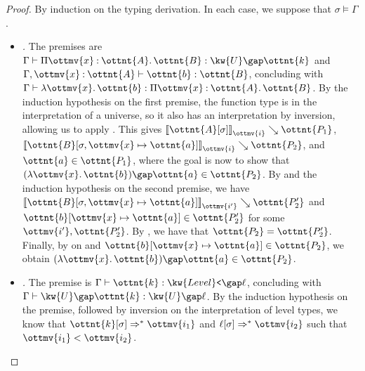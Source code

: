 \documentclass[a4paper,UKenglish,cleveref,autoref,thm-restate]{lipics-v2021}
\begin{document}
\begin{proof}
  By induction on the typing derivation.
  In each case, we suppose that $ \sigma  \vDash  \Gamma $.
  \begin{itemize}
    \item \textit{.}
      The premises are $ \Gamma  \vdash   \Pi  \ottmv{x}  \mathbin{:}  \ottnt{A}  \mathpunct{.}  \ottnt{B}   \mathrel{:}   \kw{U} \gap  \ottnt{k}  $ and $  \Gamma ,  \ottmv{x}  \mathbin{:}  \ottnt{A}   \vdash  \ottnt{b}  \mathrel{:}  \ottnt{B} $,
      concluding with $ \Gamma  \vdash   \lambda  \ottmv{x}  \mathpunct{.}  \ottnt{b}   \mathrel{:}   \Pi  \ottmv{x}  \mathbin{:}  \ottnt{A}  \mathpunct{.}  \ottnt{B}  $.
      By the induction hypothesis on the first premise,
      the function type is in the interpretation of a universe,
      so it also has an interpretation by inversion,
      allowing us to apply .
      This gives $ \mathopen{\llbracket}   \ottnt{A} [  \sigma  ]   \mathclose{\rrbracket}_{ \ottmv{i} } \searrow  \ottnt{P_{{\mathrm{1}}}} $, $ \mathopen{\llbracket}   \ottnt{B} [   \sigma ,  \ottmv{x}  \mapsto  \ottnt{a}   ]   \mathclose{\rrbracket}_{ \ottmv{i} } \searrow  \ottnt{P_{{\mathrm{2}}}} $, and $ \ottnt{a}  \in  \ottnt{P_{{\mathrm{1}}}} $,
      where the goal is now to show that $   (  \lambda  \ottmv{x}  \mathpunct{.}  \ottnt{b}  )   \gap  \ottnt{a}   \in  \ottnt{P_{{\mathrm{2}}}} $.
      By  and the induction hypothesis on the second premise,
      we have $ \mathopen{\llbracket}   \ottnt{B} [   \sigma ,  \ottmv{x}  \mapsto  \ottnt{a}   ]   \mathclose{\rrbracket}_{ \ottmv{i'} } \searrow  \ottnt{P'_{{\mathrm{2}}}} $ and $  \ottnt{b} [  \ottmv{x}  \mapsto  \ottnt{a}  ]   \in  \ottnt{P'_{{\mathrm{2}}}} $ for some $\ottmv{i'}, \ottnt{P'_{{\mathrm{2}}}}$.
      By , we have that $\ottnt{P_{{\mathrm{2}}}} = \ottnt{P'_{{\mathrm{2}}}}$.
      Finally, by  on  and $  \ottnt{b} [  \ottmv{x}  \mapsto  \ottnt{a}  ]   \in  \ottnt{P_{{\mathrm{2}}}} $,
      we obtain $   (  \lambda  \ottmv{x}  \mathpunct{.}  \ottnt{b}  )   \gap  \ottnt{a}   \in  \ottnt{P_{{\mathrm{2}}}} $.
    \item \textit{.}
      The premise is $ \Gamma  \vdash  \ottnt{k}  \mathrel{:}   \kw{Level}\texttt{<} \gap  \ell  $,
      concluding with $ \Gamma  \vdash   \kw{U} \gap  \ottnt{k}   \mathrel{:}   \kw{U} \gap  \ell  $.
      By the induction hypothesis on the premise,
      followed by inversion on the interpretation of level types,
      we know that $  \ottnt{k} [  \sigma  ]   \Rightarrow^\ast   \ottmv{i_{{\mathrm{1}}}}  $ and $  \ell [  \sigma  ]   \Rightarrow^\ast   \ottmv{i_{{\mathrm{2}}}}  $ such that $ \ottmv{i_{{\mathrm{1}}}}  <  \ottmv{i_{{\mathrm{2}}}} $.

\end{itemize}
\end{proof}
\end{document}
